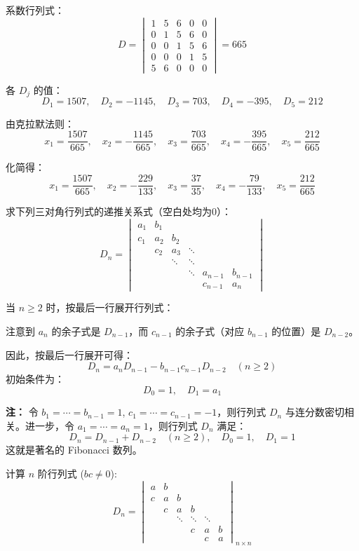 \documentclass[lang=cn,12pt]{elegantbook}
\begin{document}
\begin{solution}
系数行列式：
\[
D = \begin{vmatrix}
1 & 5 & 6 & 0 & 0 \\
0 & 1 & 5 & 6 & 0 \\
0 & 0 & 1 & 5 & 6 \\
0 & 0 & 0 & 1 & 5 \\
5 & 6 & 0 & 0 & 0
\end{vmatrix} = 665
\]

各 $D_j$ 的值：
\[
D_1 = 1507, \quad D_2 = -1145, \quad D_3 = 703, \quad D_4 = -395, \quad D_5 = 212
\]

由克拉默法则：
\[
x_1 = \frac{1507}{665}, \quad x_2 = -\frac{1145}{665}, \quad x_3 = \frac{703}{665}, \quad x_4 = -\frac{395}{665}, \quad x_5 = \frac{212}{665}
\]

化简得：
\[
x_1 = \frac{1507}{665}, \quad x_2 = -\frac{229}{133}, \quad x_3 = \frac{37}{35}, \quad x_4 = -\frac{79}{133}, \quad x_5 = \frac{212}{665}
\]
\end{solution}

\begin{example}
求下列三对角行列式的递推关系式（空白处均为0）：
\[
D_n = 
\begin{vmatrix}
a_1 & b_1 \\
c_1 & a_2 & b_2 \\
& c_2 & a_3 & \ddots \\
& & \ddots & \ddots \\
& & & \ddots & a_{n-1} & b_{n-1} \\
& & & & c_{n-1} & a_n
\end{vmatrix}
\]
\end{example}

\begin{solution}
当 $n \geq 2$ 时，按最后一行展开行列式：

注意到 $a_n$ 的余子式是 $D_{n-1}$，而 $c_{n-1}$ 的余子式（对应 $b_{n-1}$ 的位置）是 $D_{n-2}$。

因此，按最后一行展开可得：
\[
D_n = a_n D_{n-1} - b_{n-1} c_{n-1} D_{n-2} \quad (n \geq 2)
\]
初始条件为：
\[
D_0 = 1, \quad D_1 = a_1
\]

\textbf{注：} 令 $b_1 = \cdots = b_{n-1} = 1$, $c_1 = \cdots = c_{n-1} = -1$，则行列式 $D_n$ 与连分数密切相关。进一步，令 $a_1 = \cdots = a_n = 1$，则行列式 $D_n$ 满足：
\[
D_n = D_{n-1} + D_{n-2} \quad (n \geq 2), \quad D_0 = 1, \quad D_1 = 1
\]
这就是著名的 Fibonacci 数列。
\end{solution}

\begin{example}
计算 \( n \) 阶行列式 (\( bc \neq 0 \)):
\[
D_n = 
\begin{vmatrix}
a & b & & & & \\
c & a & b & & & \\
    & c & a & b & & \\
    &   & \ddots & \ddots & \ddots & \\
    & & & c & a & b \\
    & & & & c & a
\end{vmatrix}_{n \times n}
\]
\end{example}
\end{document}
